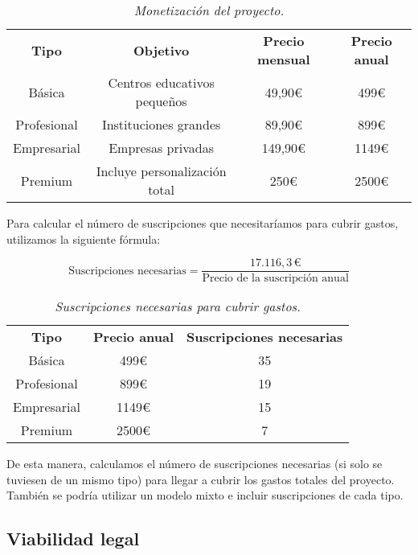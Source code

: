 \begin{table}[H]
    \centering
    \begin{tabular}{| c | c | c | c | }\hline
        \Xhline{2\arrayrulewidth}
        \textbf{Tipo} & \textbf{Objetivo} & \textbf{Precio mensual} & \textbf{Precio anual} \\ \Xhline{2\arrayrulewidth}
        Básica & Centros educativos pequeños & 49,90€ & 499€ \\ \hline
        Profesional & Instituciones grandes & 89,90€ & 899€ \\ \hline
        Empresarial & Empresas privadas & 149,90€ & 1149€ \\ \hline
        Premium & Incluye personalización total & 250€ & 2500€ \\ \hline
    \end{tabular}
    \caption{\textit{Monetización del proyecto.}}
\end{table}

Para calcular el número de suscripciones que necesitaríamos para cubrir gastos, utilizamos la siguiente fórmula:

\[
    \text{Suscripciones necesarias} = \frac{17.116{,}3\,€}{\text{Precio de la suscripción anual}}
\]

\begin{table}[H]
    \centering
    \begin{tabular}{| c | c | c | }\hline
        \Xhline{2\arrayrulewidth}
        \textbf{Tipo} & \textbf{Precio anual} & \textbf{Suscripciones necesarias} \\ \Xhline{2\arrayrulewidth}
        Básica & 499€ & 35 \\ \hline
        Profesional & 899€ & 19 \\ \hline
        Empresarial & 1149€ & 15 \\ \hline
        Premium & 2500€ & 7 \\ \hline
    \end{tabular}
    \caption{\textit{Suscripciones necesarias para cubrir gastos.}}
\end{table}

De esta manera, calculamos el número de suscripciones necesarias (si solo se tuviesen de un mismo tipo)
para llegar a cubrir los gastos totales del proyecto.
También se podría utilizar un modelo mixto e incluir suscripciones de cada tipo.

\subsection{Viabilidad legal}

